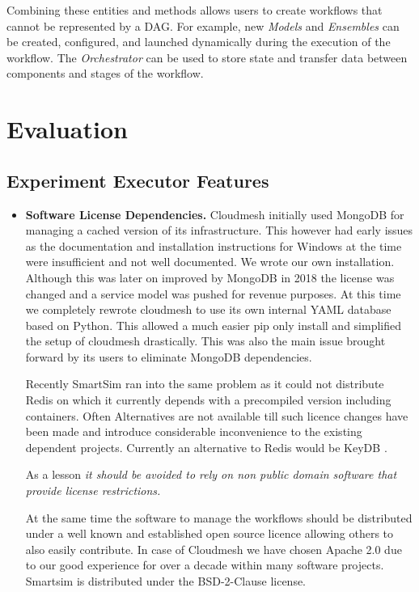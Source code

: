 \documentclass[utf8]{FrontiersinVancouver} %
\begin{document}
Combining these entities and methods allows users to create workflows that cannot be represented by a DAG. For example, new {\em Models} and {\em Ensembles} can be created, configured, and launched dynamically during the execution of the workflow. The {\em Orchestrator} can be used to store state and transfer data between components and stages of the workflow.



\section{Evaluation}



\subsection{Experiment Executor Features}



\begin{itemize}

\item {\bf Software License Dependencies.} Cloudmesh initially used MongoDB for managing a cached version of its infrastructure. This however had early issues as the documentation and installation instructions for Windows at the time were insufficient and not well documented. We wrote our own installation. Although this was later on improved by MongoDB in 2018 the license was changed and a service model was pushed for revenue purposes. At this time we completely rewrote cloudmesh to use its own internal YAML database based on Python. This allowed 
a much easier pip only install and simplified the setup of cloudmesh drastically. This was also the main issue brought forward by its users to eliminate MongoDB dependencies. 

Recently SmartSim ran into the same problem as it could not distribute Redis on which it currently depends with a precompiled version including containers. Often Alternatives are not available till such licence changes have been made and introduce considerable inconvenience to the existing dependent projects. Currently an alternative to Redis would be KeyDB  \citep{keydb}. 

As a lesson {\em it should be avoided to rely on non public domain software that provide license restrictions.}

At the same time the software to manage the workflows should be distributed under a well known and established open source licence allowing others to also easily contribute. In case of Cloudmesh we have chosen Apache 2.0 due to our good experience for over a decade within many software projects.
Smartsim is distributed under the BSD-2-Clause license.

\end{itemize}
\end{document}
